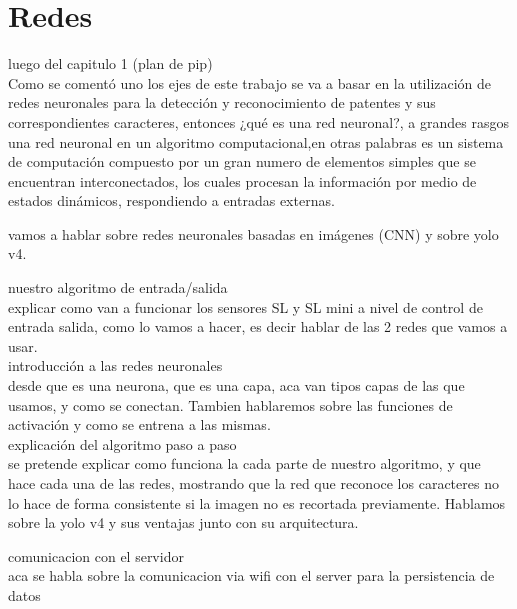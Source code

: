 \section{Redes}

luego del capitulo 1 (plan de pip)\\

Como se comentó uno los ejes de este trabajo se va a basar en la utilización de redes neuronales para la detección y reconocimiento de patentes y sus correspondientes caracteres, entonces ¿qué es una red neuronal?, a grandes rasgos una red neuronal en un algoritmo computacional,en otras palabras es un sistema de computación compuesto por un gran numero de elementos simples que se encuentran interconectados, los cuales procesan la información por medio de estados dinámicos, respondiendo a entradas externas.

vamos a hablar sobre redes neuronales basadas en imágenes (CNN) y sobre yolo v4.

nuestro algoritmo de entrada/salida \\

explicar como van a funcionar los sensores SL y SL mini a nivel de control de entrada salida,
como lo vamos a hacer, es decir hablar de las 2 redes que vamos a usar. \\

introducción a las redes neuronales \\
desde que es una neurona, que es una capa, aca van tipos capas de las que usamos, y como se conectan. Tambien hablaremos sobre las funciones de activación y como se entrena a las mismas. \\

explicación del algoritmo paso a paso \\

se pretende explicar como funciona la cada parte de nuestro algoritmo, y que hace cada una de las redes, mostrando que la red que reconoce los caracteres no lo hace de forma consistente si la imagen no es recortada previamente. Hablamos sobre la yolo v4 y sus ventajas junto con su arquitectura.

comunicacion con el servidor \\

aca se habla sobre la comunicacion via wifi con el server para la persistencia de datos \\